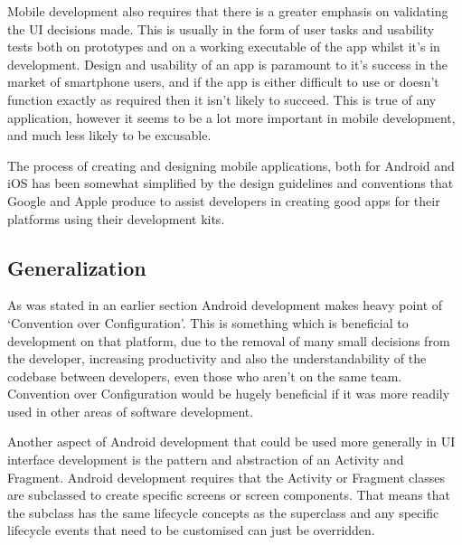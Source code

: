 \documentclass[11pt,english,numbers=endperiod,parskip=half]{scrartcl}
\begin{document}
    Mobile development also requires that there is a greater emphasis on
    validating the UI decisions made. This is usually in the form of user tasks
    and usability tests both on prototypes and on a working executable of the
    app whilst it's in development. Design and usability of an app is paramount
    to it's success in the market of smartphone users, and if the app is either
    difficult to use or doesn't function exactly as required then it isn't
    likely to succeed. This is true of any application, however it seems to be
    a lot more important in mobile development, and much less likely to be
    excusable.

    The process of creating and designing mobile applications, both for Android
    and iOS has been somewhat simplified by the design guidelines and
    conventions that Google and Apple produce to assist developers in creating
    good apps for their platforms using their development kits.

  \subsection{Generalization}
    As was stated in an earlier section Android development makes heavy point of
    `Convention over Configuration'. This is something which is beneficial to
    development on that platform, due to the removal of many small decisions
    from the developer, increasing productivity and also the understandability
    of the codebase between developers, even those who aren't on the same team.
    Convention over Configuration would be hugely beneficial if it was more
    readily used in other areas of software development.

    Another aspect of Android development that could be used more generally in
    UI interface development is the pattern and abstraction of an Activity and
    Fragment. Android development requires that the Activity or Fragment classes
    are subclassed to create specific screens or screen components. That means
    that the subclass has the same lifecycle concepts as the superclass and
    any specific lifecycle events that need to be customised can just be
    overridden.
\end{document}
